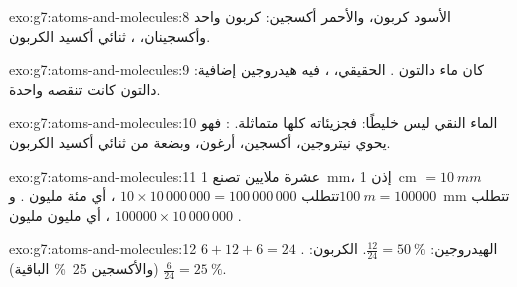 \begin{solution}{exo:g7:atoms-and-molecules:8}
الأسود كربون، والأحمر أكسجين: كربون واحد وأكسجينان، ،
ثنائي أكسيد الكربون.
\end{solution}

\begin{solution}{exo:g7:atoms-and-molecules:9}
كان ماء دالتون .  الحقيقي، ، فيه  هيدروجين
إضافية:  دالتون كانت تنقصه  واحدة.
\end{solution}

\begin{solution}{exo:g7:atoms-and-molecules:10}
الماء النقي ليس خليطًا: فجزيئاته كلها  
متماثلة.  : فهو يحوي  نيتروجين، 
أكسجين،  أرغون، وبضعة  من ثنائي أكسيد الكربون.
\end{solution}

\begin{solution}{exo:g7:atoms-and-molecules:11}
عشرة ملايين  تصنع \qty{1}{mm}، إذن \qty{1}{cm} $= \qty{10}{mm}$
تتطلب $10 \times 10\,000\,000 = 100\,000\,000$ ، أي مئة مليون .
و$\qty{100}{m} = \num{100000}$~mm تتطلب $\num{100000}\times 10\,000\,000$
، أي مليون مليون .
\end{solution}

\begin{solution}{exo:g7:atoms-and-molecules:12}
$6 + 12 + 6 = 24$ . الهيدروجين: $\frac{12}{24} = \qty{50}{\percent}$.
الكربون: $\frac{6}{24} = \qty{25}{\percent}$ (والأكسجين
\qty{25}{\percent} الباقية).
\end{solution}

